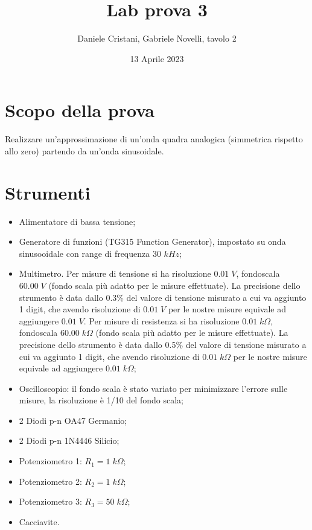 \documentclass[11pt]{article}
\title{Lab prova 3}
\author{Daniele Cristani, Gabriele Novelli, tavolo 2}
\date{13 Aprile 2023}
\begin{document}
	
	\maketitle
	
	\begin{abstract}
		
	\end{abstract}
	\section{Scopo della prova}
	Realizzare un’approssimazione di un’onda
	quadra analogica (simmetrica rispetto allo zero) partendo da un’onda sinusoidale.
	
	\section{Strumenti}
	\begin{itemize}
		\item Alimentatore di bassa tensione;
		\item Generatore di funzioni (TG315 Function Generator), impostato su onda sinusooidale con range di frequenza 30 $kHz$;
		\item Multimetro. Per misure di tensione si ha risoluzione $0.01 \; V$, fondoscala $60.00 \; V$ (fondo scala più adatto per le misure effettuate). La precisione dello strumento è data dallo 0.3\% del valore di tensione misurato a cui va aggiunto 1 digit, che avendo risoluzione di $0.01 \; V$ per le nostre misure equivale ad aggiungere $0.01 \; V$. Per misure di resistenza si ha risoluzione $0.01 \; k\Omega$, fondoscala $60.00 \; k\Omega$ (fondo scala più adatto per le misure effettuate). La precisione dello strumento è data dallo 0.5\% del valore di tensione misurato a cui va aggiunto 1 digit, che avendo risoluzione di $0.01 \; k\Omega$ per le nostre misure equivale ad aggiungere $0.01 \; k\Omega$;
		\item Oscilloscopio: il fondo scala è stato variato per minimizzare l’errore sulle misure, la risoluzione è 1/10 del fondo scala;
		\item 2 Diodi p-n OA47 Germanio;
		\item 2 Diodi p-n 1N4446 Silicio;
		\item Potenziometro 1: $R_1 = 1 \; k\Omega$;
		\item Potenziometro 2: $R_2 = 1 \; k\Omega$;
		\item Potenziometro 3: $R_3 = 50 \; k\Omega$;
		\item Cacciavite.
	\end{itemize}
\end{document}
